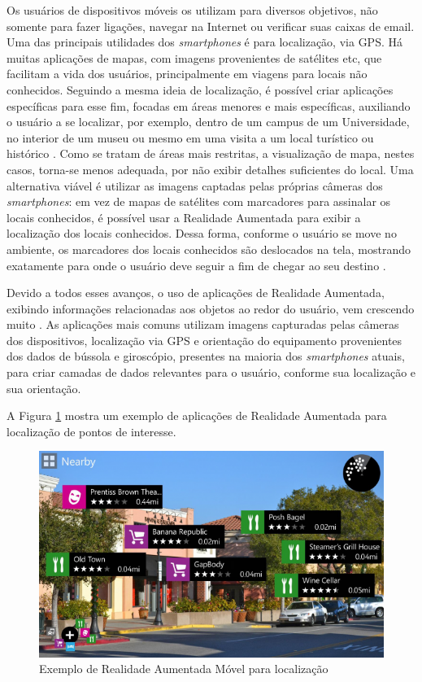 Os usuários de dispositivos móveis os utilizam para diversos objetivos, não somente para fazer
ligações, navegar na Internet ou verificar suas caixas de email. Uma das principais utilidades
dos \textit{smartphones} é para localização, via \gls{GPS}. Há muitas aplicações de mapas, 
com imagens provenientes 
de satélites etc, que facilitam a vida dos usuários, principalmente em viagens para locais não
conhecidos. Seguindo a mesma ideia de localização, é possível criar aplicações específicas para
esse fim, focadas em áreas menores e mais específicas, auxiliando o usuário a se localizar, por exemplo, dentro
de um campus de um Universidade, no interior de um museu \cite{ARMuseumGuide} ou mesmo em uma
visita a um local turístico ou histórico \cite{HouseOfOlbrich}. 
Como se tratam de áreas mais restritas, a visualização de mapa, nestes casos, torna-se
menos adequada, por não exibir detalhes suficientes do local. Uma alternativa viável é utilizar as 
imagens captadas pelas próprias câmeras dos \textit{smartphones}: em vez de mapas de satélites com marcadores
para assinalar os locais conhecidos, é possível usar a Realidade Aumentada para exibir a localização dos
locais conhecidos. Dessa forma, conforme o usuário se move no ambiente, os marcadores dos locais conhecidos são
deslocados na tela, mostrando exatamente para onde o usuário deve seguir a fim de chegar ao seu destino 
\cite{MOOAR, MOOAR_Study}.

Devido a todos esses avanços, o uso de aplicações de Realidade Aumentada, exibindo informações relacionadas aos objetos
ao redor do usuário, vem crescendo muito \cite{BooksOnAShelf}. As aplicações mais comuns utilizam imagens capturadas pelas câmeras
dos dispositivos, localização via \gls{GPS} e orientação do equipamento provenientes dos dados de bússola e giroscópio,
presentes na maioria
dos \textit{smartphones} atuais, para criar camadas de dados relevantes para o usuário, conforme sua localização e sua orientação.


A Figura \ref{fig:AR-map-locations12} mostra um exemplo de aplicações de Realidade
Aumentada para localização de pontos de interesse.

\begin{figure}[h!]
    \centering
    \caption{Exemplo de Realidade Aumentada Móvel para localização}
    \label{fig:AR-map-locations12}
    \includegraphics[width=15cm]{resources/nokia_city_lens-625x373-c.png}
\end{figure}




